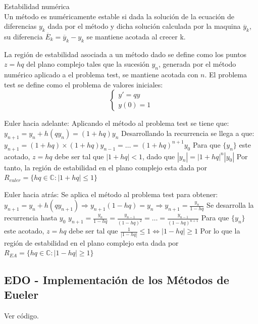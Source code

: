 \documentclass{endm}
\begin{document}
Estabilidad numérica \\
Un método es numéricamente estable si dada la solución de la ecuación de diferencias $y_k$ dada por el método y dicha solución
calculada por la maquina $\overline{y}_k$, su diferencia $\overline{E}_k = \overline{y}_k - y_k$ se mantiene acotada al crecer k.

La región de estabilidad asociada a un método dado se define como los puntos $z = hq$ del plano complejo tales que 
la sucesión ${y_n}$, generada por el método numérico aplicado a el problema test, se mantiene acotada con $n$.
El problema test se define como el problema de valores iniciales:
\begin{equation*}
\begin{cases}
    y' = qy \\
    y(0) = 1
\end{cases}
\end{equation*}

Euler hacia adelante:
Aplicando el método al problema test se tiene que:
$y_{n+1} = y_n + h(qy_n) = (1 + hq)y_n$
Desarrollando la recurrencia se llega a que:
$y_{n+1} = (1 + hq)\times (1 + hq)y_{n-1} = \dots = (1 + hq)^{n+1}y_0$
Para que $\{y_n\}$ este acotado, $z = hq$ debe ser tal que $|1 + hq| <1$, dado que $|y_n| = |1 + hq|^n|y_0|$
Por tanto, la región de estabilidad en el plano complejo esta dada por $R_{euler} = \{hq \in \mathbb{C}:|1 + hq| \leq 1\}$

Euler hacia atrás:
Se aplica el método al problema test para obtener:
$y_{n+1} = y_n + h(qy_{n+1}) \Rightarrow y_{n+1}(1 - hq) = y_n \Rightarrow y_{n+1} = \frac{y_n}{1 - hq}$
Se desarrolla la recurrencia hasta $y_0$
$y_{n+1} = \frac{y_n}{1 - hq} = \frac{y_{n-1}}{(1 - hq)^2} = \dots = \frac{y_{n-1}}{(1 - hq)^{n+1}}$
Para que $\{y_n\}$ este acotado, $z = hq$ debe ser tal que $\frac{1}{|1 - hq|} \leq 1 \iff |1 - hq| \geq 1$
Por lo que la región de estabilidad en el plano complejo esta dada por $R_{EA} = \{hq \in \mathbb{C}:|1 - hq| \geq 1\}$


\subsection{EDO - Implementación de los Métodos de Eueler}

Ver código.

\end{document}
